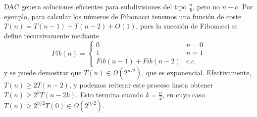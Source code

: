 \documentclass[AL.tex]{subfiles}
\begin{document}
\begin{nota}
DAC genera soluciones eficientes para subdivisiones del tipo $\frac{n}{b}$, pero no $n-c$. Por ejemplo, para calcular los números de Fibonacci tenemos una función de coste $T(n)=T(n-1)+T(n-2)+O(1)$, pues la sucesión de Fibonacci se define recursivamente mediante
\[
Fib(n)=\begin{cases}
0 & n=0\\
1 & n=1\\
Fib(n-1)+Fib(n-2) & c.c.
\end{cases}
\]
y se puede demostrar que $T(n)\in\Omega(2^{n/2})$, que es exponencial. Efectivamente, $T(n)\geq 2T(n-2)$, y podemos reiterar este proceso hasta obtener $T(n)\geq 2^kT(n-2k)$. Esto termina cuando $k=\frac{n}{2}$, en cuyo caso $T(n)\geq 2^{n/2}T(0)\in\Omega(2^{n/2})$. 
\end{nota}
\end{document}
